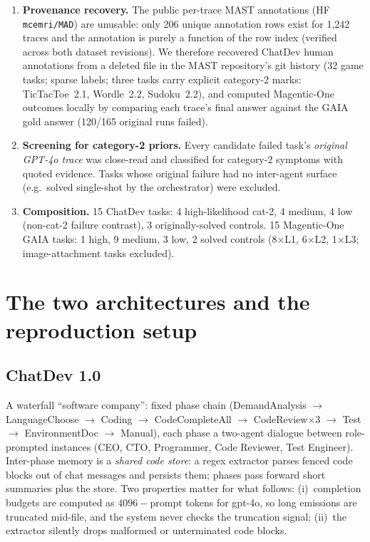 \documentclass[11pt]{article}
\begin{document}
\begin{enumerate}
\item \textbf{Provenance recovery.} The public per-trace MAST annotations
(HF \texttt{mcemri/MAD}) are unusable: only 206 unique annotation rows exist
for 1{,}242 traces and the annotation is purely a function of the row index
(verified across both dataset revisions). We therefore recovered ChatDev
human annotations from a deleted file in the MAST repository's git history
(32 game tasks; sparse labels; three tasks carry explicit category-2 marks:
TicTacToe~2.1, Wordle~2.2, Sudoku~2.2), and computed Magentic-One outcomes
locally by comparing each trace's final answer against the GAIA gold answer
(120/165 original runs failed).
\item \textbf{Screening for category-2 priors.} Every candidate failed
task's \emph{original GPT-4o trace} was close-read and classified for
category-2 symptoms with quoted evidence. Tasks whose original failure had no
inter-agent surface (e.g.\ solved single-shot by the orchestrator) were
excluded.
\item \textbf{Composition.} 15 ChatDev tasks: 4 high-likelihood cat-2, 4
medium, 4 low (non-cat-2 failure contrast), 3 originally-solved controls.
15 Magentic-One GAIA tasks: 1 high, 9 medium, 3 low, 2 solved controls
(8$\times$L1, 6$\times$L2, 1$\times$L3; image-attachment tasks excluded).
\end{enumerate}

\section{The two architectures and the reproduction setup}\label{sec:arch}

\subsection{ChatDev 1.0}
A waterfall ``software company'': fixed phase chain (DemandAnalysis
$\rightarrow$ LanguageChoose $\rightarrow$ Coding $\rightarrow$
CodeCompleteAll $\rightarrow$ CodeReview$\times$3 $\rightarrow$ Test
$\rightarrow$ EnvironmentDoc $\rightarrow$ Manual), each phase a two-agent
dialogue between role-prompted instances (CEO, CTO, Programmer, Code
Reviewer, Test Engineer). Inter-phase memory is a \emph{shared code store}:
a regex extractor parses fenced code blocks out of chat messages and persists
them; phases pass forward short summaries plus the store. Two properties
matter for what follows: (i)~completion budgets are computed as
$4096 - \mathrm{prompt}$ tokens for gpt-4o, so long emissions are truncated
mid-file, and the system never checks the truncation signal; (ii)~the
extractor silently drops malformed or unterminated code blocks.
\end{document}
